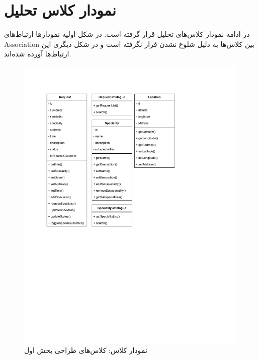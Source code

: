 

\chapter{نمودار کلاس تحلیل}
\label{chapter:classAnalysis}

در ادامه نمودار کلاس‌های تحلیل قرار گرفته است. در شکل اولیه نمودار‌ها ارتباط‌های Association بین کلاس‌ها به دلیل شلوغ نشدن قرار نگرفته است و در شکل دیگری این ارتباط‌ها آورده شده‌اند.


\begin{figure}[ht!]
	\centering
	\includegraphics[scale=0.8]{figs/OOD-class-page-1.pdf}
	\caption{نمودار کلاس: کلاس‌های طراحی بخش اول}
\end{figure}
\FloatBarrier
\newpage


